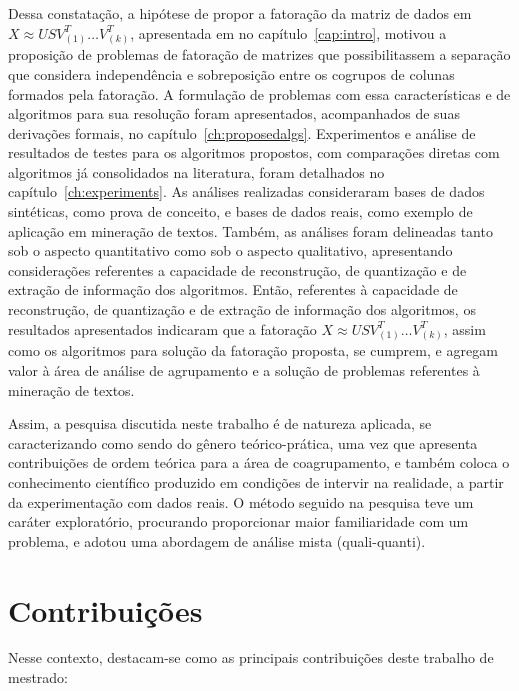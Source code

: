 \documentclass[
    12pt,                %
    oneside,            %
    a4paper,            %
    english,            %
    brazil                %
    ]{abntex2ppgsi}
\begin{document}
Dessa constatação, a hipótese de propor a fatoração da matriz de dados em $X \approx USV_{(1)}^T \dots V_{(k)}^T$, apresentada em no capítulo~\ref{cap:intro}, motivou a proposição de problemas de fatoração de matrizes que possibilitassem a separação que considera independência e sobreposição entre os cogrupos de colunas formados pela fatoração.
A formulação de problemas com essa características e de algoritmos para sua resolução foram apresentados, acompanhados de suas derivações formais, no capítulo~\ref{ch:proposedalgs}.
Experimentos e análise de resultados de testes para os algoritmos propostos, com comparações diretas com algoritmos já consolidados na literatura, foram detalhados no capítulo~\ref{ch:experiments}.
As análises realizadas consideraram bases de dados sintéticas, como prova de conceito, e bases de dados reais, como exemplo de aplicação em mineração de textos.
Também, as análises foram delineadas tanto sob o aspecto quantitativo como sob o aspecto qualitativo, apresentando considerações referentes a capacidade de reconstrução, de quantização e de extração de informação dos algoritmos.
Então, referentes à capacidade de reconstrução, de quantização e de extração de informação dos algoritmos, os resultados apresentados indicaram que a fatoração $X \approx USV_{(1)}^T \dots V_{(k)}^T$, assim como os algoritmos para solução da fatoração proposta, se cumprem, e agregam valor à área de análise de agrupamento e a solução de problemas referentes à mineração de textos.

Assim, a pesquisa discutida neste trabalho é de natureza aplicada, se caracterizando como sendo do gênero teórico-prática, uma vez que apresenta contribuições de ordem teórica para a área de coagrupamento, e também coloca o conhecimento científico produzido em condições de intervir na realidade, a partir da experimentação com dados reais. O método seguido na pesquisa teve um caráter exploratório, procurando proporcionar maior familiaridade com um problema, e adotou uma abordagem de análise mista (quali-quanti).

\section{Contribuições}

Nesse contexto, destacam-se como as principais contribuições deste trabalho de mestrado:
\end{document}
